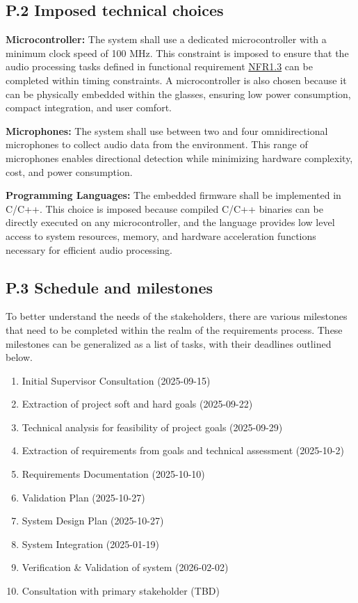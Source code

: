 \documentclass[12pt]{article}
\theoremstyle{definition}
\begin{document}
\subsection{P.2 Imposed technical choices}

\textbf{Microcontroller:}  
The system shall use a dedicated microcontroller with a minimum clock speed of
100 MHz. This constraint is imposed to ensure that the audio processing tasks
defined in functional requirement \hyperref[NFR1_3]{NFR1.3} can be
completed within timing constraints. A microcontroller is also chosen
because it can be physically embedded within the glasses, ensuring
low power consumption, compact integration, and user comfort.

\textbf{Microphones:}  
The system shall use between two and four omnidirectional microphones to collect
audio data from the environment. This range of microphones enables directional
detection while minimizing hardware complexity, cost, and power consumption.

\textbf{Programming Languages:}  
The embedded firmware shall be implemented in C/C++. This choice is imposed
because compiled C/C++ binaries can be directly executed on any microcontroller,
and the language provides low level access to system resources, memory, and
hardware acceleration functions necessary for efficient audio processing.

\subsection{P.3 Schedule and milestones} \label{item: p3}   

To better understand the needs of the stakeholders, there are various milestones
 that need to be completed within the realm of the requirements process.
These milestones can be generalized as a list of tasks, with their deadlines 
outlined below.

\begin{enumerate}
  \item Initial Supervisor Consultation (2025-09-15) \label{item: p3-1}
  \item Extraction of project soft and hard goals (2025-09-22) 
  \label{item: p3-2}
  \item Technical analysis for feasibility of project goals (2025-09-29) 
  \label{item: p3-3}
  \item Extraction of requirements from goals and technical assessment 
  (2025-10-2) \label{item: p3-4}
  \item Requirements Documentation (2025-10-10) \label{item: p3-5}
  \item Validation Plan (2025-10-27) \label{item: p3-6}
  \item System Design Plan (2025-10-27) \label{item: p3-7}
  \item System Integration (2025-01-19) \label{item: p3-8}
  \item Verification \& Validation of system (2026-02-02) \label{item: p3-9}
  \item Consultation with primary stakeholder (TBD) \label{item: p3-10}
\end{enumerate}
\end{document}
